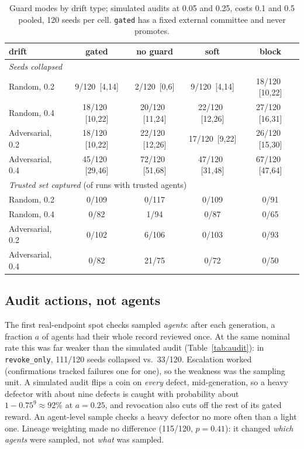 \documentclass[11pt]{article}
\newcommand{\ci}[2]{\,{\scriptsize\color{gray}[#1,#2]}}
\newcommand{\code}[1]{\texttt{#1}}
\begin{document}
\begin{table}[h]
\centering\small
\begin{tabular}{lcccc}
\toprule
drift & gated & no guard & soft & block \\
\midrule
\multicolumn{5}{l}{\emph{Seeds collapsed}} \\
Random, 0.2 & 9/120 \ci{4}{14} & 2/120 \ci{0}{6} & 9/120 \ci{4}{14} & 18/120 \ci{10}{22} \\
Random, 0.4 & 18/120 \ci{10}{22} & 20/120 \ci{11}{24} & 22/120 \ci{12}{26} & 27/120 \ci{16}{31} \\
Adversarial, 0.2 & 18/120 \ci{10}{22} & 22/120 \ci{12}{26} & 17/120 \ci{9}{22} & 26/120 \ci{15}{30} \\
Adversarial, 0.4 & 45/120 \ci{29}{46} & 72/120 \ci{51}{68} & 47/120 \ci{31}{48} & 67/120 \ci{47}{64} \\
\midrule
\multicolumn{5}{l}{\emph{Trusted set captured} (of runs with trusted agents)} \\
Random, 0.2 & 0/109 & 0/117 & 0/109 & 0/91 \\
Random, 0.4 & 0/82 & 1/94 & 0/87 & 0/65 \\
Adversarial, 0.2 & 0/102 & 6/106 & 0/103 & 0/93 \\
Adversarial, 0.4 & 0/82 & 21/75 & 0/72 & 0/50 \\
\bottomrule
\end{tabular}
\caption{Guard modes by drift type; simulated audits at 0.05 and 0.25, costs 0.1 and 0.5
pooled, 120 seeds per cell. \code{gated} has a fixed external committee and never promotes.}
\label{tab:drift}
\end{table}

\subsection{Audit actions, not agents}
\label{sec:audit}

The first real-endpoint spot checks sampled \emph{agents}: after each generation, a fraction
$a$ of agents had their whole record reviewed once. At the same nominal rate this was far
weaker than the simulated audit (Table~\ref{tab:audit}): in \code{revoke\_only}, 111/120 seeds
collapsed vs.\ 33/120. Escalation worked (confirmations tracked failures one for one), so the
weakness was the sampling unit. A simulated audit flips a coin on \emph{every} defect,
mid-generation, so a heavy defector with about nine defects is caught with probability about
$1 - 0.75^9 \approx 92\%$ at $a = 0.25$, and revocation also cuts off the rest of its gated
reward. An agent-level sample checks a heavy defector no more often than a light one. Lineage
weighting made no difference (115/120, $p = 0.41$): it changed \emph{which agents} were
sampled, not \emph{what} was sampled.
\end{document}
